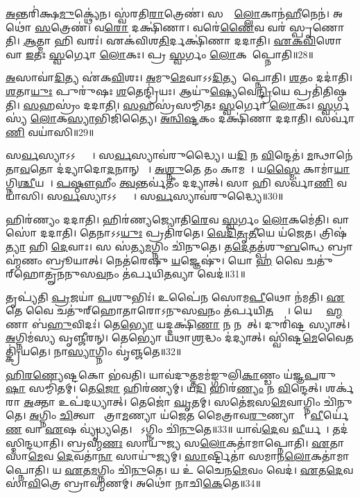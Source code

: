    \ul{𑌅}𑌨𑍍𑌤𑌰𑌿॑𑌕𑍍𑌷\ul{𑌮𑍁}𑌕𑍍𑌥𑍍𑌯𑍇॑𑌨।
   𑌸𑍍𑌵॑𑌰𑌤𑌿\ul{𑌰𑌾}𑌤𑍍𑌰𑍇𑌣॑।
   𑌸𑌰𑍍𑌵𑌾𑌁᳚\ul{𑌲𑍍𑌲𑍋}𑌕𑌾𑌨॑\ul{𑌹𑍀}𑌨𑍇𑌨॑।
   𑌅𑌥𑍋॑ \ul{𑌸}𑌤𑍍𑌰𑍇𑌣॑।
   𑌵\ul{𑌰𑍋} 𑌦𑌕𑍍𑌷𑌿॑𑌣𑌾।
   𑌵𑌰𑍇॑\ul{𑌣𑍈}𑌵 𑌵𑌰॑ 𑌸𑍍𑌪𑍃𑌣𑍋𑌤𑌿।
   \ul{𑌆}𑌤𑍍𑌮𑌾 𑌹𑌿 𑌵𑌰𑌃॑।
   𑌏𑌕॑𑌵𑌿𑌶\ul{𑌤𑌿}𑌰𑍍𑌦𑌕𑍍𑌷𑌿॑𑌣𑌾 𑌦𑌦𑌾𑌤𑌿।
   \ul{𑌏}\ul{𑌕}\ul{𑌵𑌿}\ul{}𑌶𑍋 𑌵𑌾 \ul{𑌇}𑌤𑌃 \ul{𑌸𑍍𑌵}𑌰𑍍𑌗𑍋 \ul{𑌲𑍋}𑌕𑌃।
   𑌪𑍍𑌰 \ul{𑌸𑍍𑌵}𑌰𑍍𑌗𑌂 \ul{𑌲𑍋}𑌕𑌮𑌾᳚𑌪𑍍𑌨𑍋𑌤𑌿॥28॥

   \ul{𑌅}𑌸𑌾𑌵𑌾॑\ul{𑌦𑌿}𑌤𑍍𑌯 𑌏॑𑌕\ul{𑌵𑌿}\ul{}𑌶𑌃।
   \ul{𑌅}𑌮𑍁\ul{𑌮𑍇}𑌵𑌾𑌽𑌽\ul{𑌦𑌿}𑌤𑍍𑌯𑌮𑌾᳚𑌪𑍍𑌨𑍋𑌤𑌿।
   \ul{𑌶}𑌤𑌂 𑌦𑌦𑌾॑𑌤𑌿।
   \ul{𑌶}𑌤𑌾\ul{𑌯𑍁𑌃} 𑌪𑍁𑌰𑍁॑𑌷𑌃 \ul{𑌶}𑌤𑍇𑌨𑍍𑌦𑍍𑌰𑌿॑𑌯𑌃।
   𑌆𑌯𑍁॑\ul{𑌷𑍍𑌯𑍇}𑌵𑍇\ul{𑌨𑍍𑌦𑍍𑌰𑌿}𑌯𑍇 𑌪𑍍𑌰𑌤𑌿॑𑌤𑌿𑌷𑍍𑌠𑌤𑌿।
   \ul{𑌸}𑌹𑌸𑍍𑌰𑌂॑ 𑌦𑌦𑌾𑌤𑌿।
   \ul{𑌸}𑌹𑌸𑍍𑌰॑𑌸𑌮𑍍𑌮𑌿𑌤𑌃 \ul{𑌸𑍍𑌵}𑌰𑍍𑌗𑍋 \ul{𑌲𑍋}𑌕𑌃।
   \ul{𑌸𑍍𑌵}𑌰𑍍𑌗𑌸𑍍𑌯॑ \ul{𑌲𑍋}𑌕\ul{𑌸𑍍𑌯𑌾}𑌭𑌿𑌜𑌿॑𑌤𑍍𑌯𑍈।
   \ul{𑌅}\ul{𑌨𑍍𑌵𑌿}\ul{𑌷𑍍𑌟}𑌕𑌂 𑌦𑌕𑍍𑌷𑌿॑𑌣𑌾 𑌦𑌦𑌾𑌤𑌿।
   𑌸𑌰𑍍𑌵𑌾॑\ul{𑌣𑌿} 𑌵𑌯𑌾॑𑌸𑌿॥29॥

   𑌸\ul{𑌰𑍍𑌵}𑌸𑍍𑌯𑌾𑌽𑌽𑌪𑍍𑌤𑍍𑌯𑍈᳚।
   𑌸\ul{𑌰𑍍𑌵}𑌸𑍍𑌯𑌾𑌵॑𑌰𑍁𑌦𑍍𑌧𑍍𑌯𑍈।
   𑌯\ul{𑌦𑌿} 𑌨 \ul{𑌵𑌿}𑌨𑍍𑌦𑍇𑌤॑।
   \ul{𑌮}𑌨𑍍𑌥𑌾𑌨𑍇॑𑌤𑌾\ul{𑌵}𑌤𑍋 𑌦॑𑌦𑍍𑌯𑌾𑌦𑍋\ul{𑌦}𑌨𑌾𑌨𑍍 𑌵𑌾᳚᳚।
   \ul{𑌅}\ul{𑌶𑍍𑌨𑍁}𑌤𑍇 𑌤𑌂 𑌕𑌾𑌮𑌮𑍍᳚।
   𑌯\ul{𑌸𑍍𑌮𑍈} 𑌕𑌾𑌮𑌾॑\ul{𑌯𑌾}𑌗𑍍𑌨𑌿\ul{𑌶𑍍𑌚𑍀}𑌯𑌤𑍇᳚।
   \ul{𑌪}\ul{𑌷𑍍𑌠𑍗}𑌹𑍀𑌂 \ul{𑌤𑍍𑌵}𑌨𑍍𑌤𑌰𑍍𑌵॑𑌤𑍀𑌂 𑌦𑌦𑍍𑌯𑌾𑌤𑍍।
   𑌸𑌾 𑌹𑌿 𑌸𑌰𑍍𑌵𑌾॑\ul{𑌣𑌿} 𑌵𑌯𑌾॑𑌸𑌿।
   𑌸\ul{𑌰𑍍𑌵}𑌸𑍍𑌯𑌾𑌽𑌽𑌪𑍍𑌤𑍍𑌯𑍈᳚।
   𑌸\ul{𑌰𑍍𑌵}𑌸𑍍𑌯𑌾𑌵॑𑌰𑍁𑌦𑍍𑌧𑍍𑌯𑍈॥30॥

   𑌹𑌿𑌰॑𑌣𑍍𑌯𑌂 𑌦𑌦𑌾𑌤𑌿।
   𑌹𑌿𑌰॑𑌣𑍍𑌯𑌜𑍍𑌯𑍋𑌤𑌿\ul{𑌰𑍇}𑌵 \ul{𑌸𑍍𑌵}𑌰𑍍𑌗𑌂 \ul{𑌲𑍋}𑌕𑌮𑍇॑𑌤𑌿।
   𑌵𑌾𑌸𑍋॑ 𑌦𑌦𑌾𑌤𑌿।
   𑌤𑍇𑌨𑌾𑌽𑌽\ul{𑌯𑍁𑌃} 𑌪𑍍𑌰𑌤𑌿॑𑌰𑌤𑍇।
   \ul{𑌵𑍇}\ul{𑌦𑌿}\ul{𑌤𑍃}\ul{𑌤𑍀}𑌯𑍇 𑌯॑𑌜𑍇𑌤।
   𑌤𑍍𑌰𑌿𑌷॑\ul{𑌤𑍍𑌯𑌾} 𑌹𑌿 \ul{𑌦𑍇}𑌵𑌾𑌃।
   𑌸 𑌸॑𑌤𑍍𑌯\ul{𑌮}𑌗𑍍𑌨𑌿𑌂 𑌚𑌿॑𑌨𑍁𑌤𑍇।
   𑌤\ul{𑌦𑍇}𑌤𑌤𑍍𑌪॑𑌶𑍁\ul{𑌬}𑌨𑍍𑌧𑍇 𑌬𑍍𑌰𑌾𑌹𑍍𑌮॑𑌣𑌂 𑌬𑍍𑌰𑍂𑌯𑌾𑌤𑍍।
   𑌨𑍇𑌤॑𑌰𑍇𑌷𑍁 \ul{𑌯}𑌜𑍍𑌞𑍇𑌷𑍁॑।
   𑌯𑍋 \ul{𑌹} 𑌵𑍈 𑌚𑌤𑍁॑𑌰𑍍‌𑌹𑍋𑌤𑍄𑌨𑌨𑍁𑌸\ul{𑌵}𑌨𑌂 𑌤॑𑌰𑍍𑌪𑌯𑌿\ul{𑌤}𑌵𑍍𑌯𑌾\sn{} 𑌵𑍇𑌦॑॥31॥

   𑌤𑍃𑌪𑍍𑌯॑𑌤𑌿 \ul{𑌪𑍍𑌰}𑌜𑌯𑌾॑ \ul{𑌪}𑌶𑍁𑌭𑌿𑌃॑।
   𑌉𑌪𑍈॑𑌨 𑌸𑍋𑌮\ul{𑌪𑍀}𑌥𑍋 𑌨॑𑌮𑌤𑌿।
   \ul{𑌏}𑌤𑍇 𑌵𑍈 𑌚𑌤𑍁॑𑌰𑍍‌𑌹𑍋𑌤𑌾𑌰𑍋𑌽𑌨𑍁𑌸\ul{𑌵}𑌨𑌂 𑌤॑𑌰𑍍𑌪𑌯𑌿\ul{𑌤}𑌵𑍍𑌯𑌾𑌃᳚।
   𑌯𑍇 𑌬𑍍𑌰𑌾᳚\ul{𑌹𑍍𑌮}𑌣𑌾 𑌬॑\ul{𑌹𑍁}𑌵𑌿𑌦𑌃॑।
   𑌤𑍇\ul{𑌭𑍍𑌯𑍋} 𑌯𑌦𑍍𑌦𑌕𑍍𑌷𑌿॑\ul{𑌣𑌾} 𑌨 𑌨𑌯𑍇᳚𑌤𑍍।
   𑌦𑍁𑌰𑌿॑𑌷𑍍𑌟 𑌸𑍍𑌯𑌾𑌤𑍍।
   \ul{𑌅}𑌗𑍍𑌨𑌿𑌮॑𑌸𑍍𑌯 𑌵𑍃𑌞𑍍𑌜𑍀𑌰𑌨𑍍।
   𑌤𑍇𑌭𑍍𑌯𑍋॑ 𑌯𑌥𑌾\ul{𑌶𑍍𑌰}𑌦𑍍𑌧𑌂 𑌦॑𑌦𑍍𑌯𑌾𑌤𑍍।
   𑌸𑍍𑌵𑌿॑𑌷𑍍𑌟\ul{𑌮𑍇}𑌵𑍈𑌤𑌤𑍍𑌕𑍍𑌰𑌿॑𑌯𑌤𑍇।
   𑌨𑌾\ul{𑌸𑍍𑌯𑌾}𑌗𑍍𑌨𑌿𑌂 𑌵𑍃॑𑌞𑍍𑌜𑌤𑍇॥32॥

   \ul{𑌹𑌿}\ul{𑌰}\ul{𑌣𑍍𑌯𑍇}𑌷𑍍𑌟𑌕𑍋 𑌭॑𑌵𑌤𑌿।
   𑌯𑌾𑌵॑𑌦𑍁\ul{𑌤𑍍𑌤}𑌮𑌮॑𑌙𑍍𑌗𑍁𑌲𑌿\ul{𑌕𑌾}𑌣𑍍𑌡𑌂 𑌯॑𑌜𑍍𑌞\ul{𑌪}𑌰𑍁\ul{𑌷𑌾} 𑌸𑌮𑍍𑌮𑌿॑𑌤𑌮𑍍।
   𑌤𑍇\ul{𑌜𑍋} 𑌹𑌿𑌰॑𑌣𑍍𑌯𑌮𑍍।
   𑌯\ul{𑌦𑌿} 𑌹𑌿𑌰॑\ul{𑌣𑍍𑌯𑌂} 𑌨 \ul{𑌵𑌿}𑌨𑍍𑌦𑍇𑌤𑍍।
   𑌶𑌰𑍍𑌕॑𑌰𑌾 \ul{𑌅}𑌕𑍍𑌤𑌾 𑌉𑌪॑𑌦𑌧𑍍𑌯𑌾𑌤𑍍।
   𑌤𑍇𑌜𑍋॑ \ul{𑌘𑍃}𑌤𑌮𑍍।
   𑌸𑌤𑍇॑𑌜𑌸\ul{𑌮𑍇}𑌵𑌾𑌗𑍍𑌨𑌿𑌂 𑌚𑌿॑𑌨𑍁𑌤𑍇।
   \ul{𑌅}𑌗𑍍𑌨𑌿𑌂 \ul{𑌚𑌿}𑌤𑍍𑌵𑌾 𑌸𑍗᳚𑌤𑍍𑌰𑌾\ul{𑌮}𑌣𑍍𑌯𑌾 𑌯॑𑌜𑍇𑌤 𑌮𑍈𑌤𑍍𑌰𑌾𑌵\ul{𑌰𑍁}𑌣𑍍𑌯𑌾 𑌵𑌾᳚।
   \ul{𑌵𑍀}𑌰𑍍𑌯𑍇॑\ul{𑌣} 𑌵𑌾 \ul{𑌏}𑌷 𑌵𑍍𑌯𑍃॑𑌧𑍍𑌯𑌤𑍇।
   𑌯𑍋᳚𑌽𑌗𑍍𑌨𑌿𑌂 𑌚𑌿॑\ul{𑌨𑍁}𑌤𑍇॥33॥
   𑌯𑌾𑌵॑\ul{𑌦𑍇}𑌵 \ul{𑌵𑍀}𑌰𑍍𑌯𑌮𑍍᳚।
   𑌤𑌦॑𑌸𑍍𑌮𑌿𑌨𑍍𑌦𑌧𑌾𑌤𑌿।
   𑌬𑍍𑌰𑌹𑍍𑌮॑\ul{𑌣𑌃} 𑌸𑌾𑌯𑍁॑𑌜𑍍𑌯 𑌸\ul{𑌲𑍋}𑌕𑌤𑌾॑𑌮𑌾𑌪𑍍𑌨𑍋𑌤𑌿।
   \ul{𑌏}𑌤𑌾𑌸𑌾॑\ul{𑌮𑍇}𑌵 \ul{𑌦𑍇}𑌵𑌤𑌾॑\ul{𑌨𑌾}\ul{} 𑌸𑌾𑌯𑍁॑𑌜𑍍𑌯𑌮𑍍।
   \ul{𑌸𑌾}𑌰𑍍𑌷𑍍𑌟𑌿𑌤𑌾॑ 𑌸𑌮𑌾𑌨\ul{𑌲𑍋}𑌕𑌤𑌾॑𑌮𑌾𑌪𑍍𑌨𑍋𑌤𑌿।
   𑌯 \ul{𑌏}𑌤\ul{𑌮}𑌗𑍍𑌨𑌿𑌂 𑌚𑌿॑\ul{𑌨𑍁}𑌤𑍇।
   𑌯 𑌉॑ 𑌚𑍈𑌨\ul{𑌮𑍇}𑌵𑌂 𑌵𑍇𑌦॑।
   \ul{𑌏}𑌤\ul{𑌦𑍇}𑌵 𑌸𑌾॑\ul{𑌵𑌿}𑌤𑍍𑌰𑍇 𑌬𑍍𑌰𑌾𑌹𑍍𑌮॑𑌣𑌮𑍍।
   𑌅𑌥𑍋॑ 𑌨𑌾𑌚𑌿\ul{𑌕𑍇}𑌤𑍇॥34॥
   \anuvakamend
  
